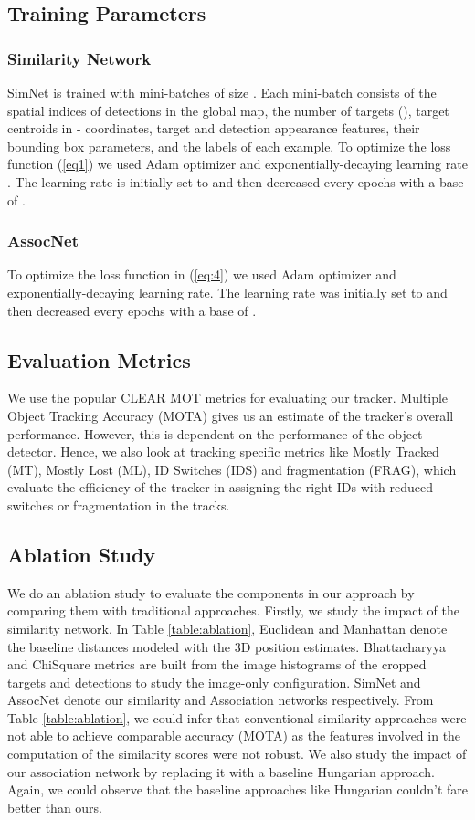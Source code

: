 \documentclass[letterpaper, 10 pt, conference]{ieeeconf}
\begin{document}
\subsection{Training Parameters}
\subsubsection{Similarity Network} SimNet is trained with mini-batches of size . Each mini-batch consists of the spatial indices of detections in the global map, the number of targets (), target centroids in - coordinates, target and detection appearance features, their bounding box parameters, and the labels of each example. To optimize the loss function (\ref{eq1}) we used Adam optimizer and exponentially-decaying learning rate \cite{Adam}. The learning rate is initially set to  and then decreased every  epochs with a base of .
\subsubsection{AssocNet} To optimize the loss function in (\ref{eq:4}) we used Adam optimizer and exponentially-decaying learning rate. The learning rate was initially set to  and then decreased every  epochs with a base of .

\subsection{Evaluation Metrics}
We use the popular CLEAR MOT metrics \cite{bernardin2008evaluating} for evaluating our tracker. Multiple Object Tracking Accuracy (MOTA) gives us an estimate of the tracker's overall performance. However, this is dependent on the performance of the object detector. Hence, we also look at tracking specific metrics like Mostly Tracked (MT), Mostly Lost (ML), ID Switches (IDS) and fragmentation (FRAG), which evaluate the efficiency of the tracker in assigning the right IDs with reduced switches or fragmentation in the tracks.  

\subsection{Ablation Study}
We do an ablation study to evaluate the components in our approach by comparing them with traditional approaches. Firstly, we study the impact of the similarity network. In Table \ref{table:ablation}, Euclidean and Manhattan denote the baseline distances modeled with the 3D position estimates. Bhattacharyya and ChiSquare metrics are built from the image histograms of the cropped targets and detections to study the image-only configuration. SimNet and AssocNet denote our similarity and Association networks respectively. From Table \ref{table:ablation}, we could infer that conventional similarity approaches were not able to achieve comparable accuracy (MOTA) as the features involved in the computation of the similarity scores were not robust. We also study the impact of our association network by replacing it with a baseline Hungarian approach. Again, we could observe that the baseline approaches like Hungarian couldn't fare better than ours.
\end{document}
